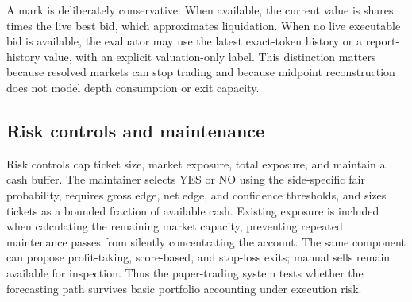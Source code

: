 A mark is deliberately conservative. When available, the current value is shares times the live best bid, which approximates liquidation. When no live executable bid is available, the evaluator may use the latest exact-token history or a report-history value, with an explicit valuation-only label. This distinction matters because resolved markets can stop trading and because midpoint reconstruction does not model depth consumption or exit capacity.

\subsection{Risk controls and maintenance}

Risk controls cap ticket size, market exposure, total exposure, and maintain a cash buffer. The maintainer selects YES or NO using the side-specific fair probability, requires gross edge, net edge, and confidence thresholds, and sizes tickets as a bounded fraction of available cash. Existing exposure is included when calculating the remaining market capacity, preventing repeated maintenance passes from silently concentrating the account. The same component can propose profit-taking, score-based, and stop-loss exits; manual sells remain available for inspection. Thus the paper-trading system tests whether the forecasting path survives basic portfolio accounting under execution risk.
